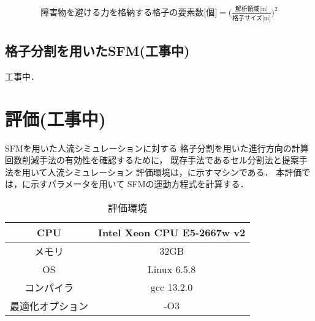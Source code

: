 
\begin{eqnarray}
 \mbox{障害物を避ける力を格納する格子の要素数[個]} =  \Big( \frac{\mbox{解析領域[m]}}{\mbox{格子サイズ[m]}} \Big) ^ 2
 \label{eq:fiw_youso_size}
\end{eqnarray}

\subsection{格子分割を用いたSFM(工事中)}
工事中．

\section{評価(工事中)}
SFMを用いた人流シミュレーションに対する
格子分割を用いた進行方向の計算回数削減手法の有効性を確認するために，
既存手法であるセル分割法と提案手法を用いて人流シミュレーション
評価環境は，に示すマシンである．
本評価では，に示すパラメータを用いて
SFMの運動方程式を計算する．


\begin{table}[tb]
  \begin{center}
    \caption{評価環境}
      \label{tb:result_env}
      \begin{tabular}{c|c}
      \hline \hline
      CPU              & Intel Xeon CPU E5-2667w v2 \\ \hline
      メモリ           & 32GB                       \\ \hline
      OS               & Linux 6.5.8               \\ \hline
      コンパイラ       & gcc 13.2.0                  \\ \hline
      最適化オプション & -O3                        \\ \hline
    \end{tabular}
  \end{center}
\end{table}

